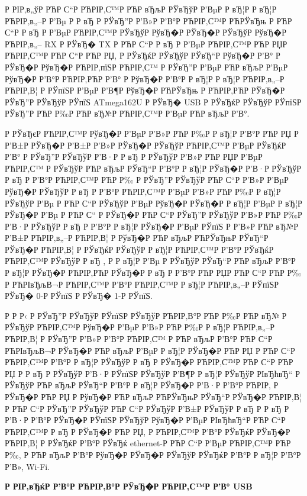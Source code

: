 \documentclass[a4paper,14pt]{extarticle}
\begin{document}
Р  РІР‚в„ўР РЋР С“Р РЋРІР‚С™Р РЋР вЂљР  РЎвЂўР  Р’ВµР  Р вЂ¦Р  Р вЂ¦Р РЋРІР‚в„–Р  Р’Вµ Р  Р вЂ  Р  РЎвЂ”Р  Р’В»Р  Р’В°Р РЋРІР‚С™Р РЋРЎвЂњ Р РЋР С“Р  Р вЂ Р  Р’ВµР РЋРІР‚С™Р  РЎвЂўР  РўвЂ�Р  РЎвЂ�Р  РЎвЂўР  РўвЂ�Р РЋРІР‚в„– RX Р  РЎвЂ� TX Р РЋР С“Р  Р вЂ Р  Р’ВµР РЋРІР‚С™Р РЋР РЏР РЋРІР‚С™Р РЋР С“Р РЋР РЏ, Р  РЎвЂќР  РЎвЂўР  РЎвЂ“Р  РўвЂ�Р  Р’В° Р  РЎвЂ�Р  РўвЂ�Р РЋРІР‚пїЅР РЋРІР‚С™ Р  РЎвЂ”Р  Р’ВµР РЋР вЂљР  Р’ВµР  РўвЂ�Р  Р’В°Р РЋРІР‚РЋР  Р’В° Р  РўвЂ�Р  Р’В°Р  Р вЂ¦Р  Р вЂ¦Р РЋРІР‚в„–Р РЋРІР‚В¦ Р  РЎпїЅР  Р’ВµР  Р’В¶Р  РўвЂ�Р РЋРЎвЂњ Р РЋРІР‚РЋР  РЎвЂ�Р  РЎвЂ”Р  РЎвЂўР  РЎпїЅ ATmega162U Р  РЎвЂ� USB Р  РЎвЂќР  РЎвЂўР  РЎпїЅР  РЎвЂ”Р РЋР Р‰Р РЋР вЂ№Р РЋРІР‚С™Р  Р’ВµР РЋР вЂљР  Р’В°.

Р  РЎвЂєР РЋРІР‚С™Р  РўвЂ�Р  Р’ВµР  Р’В»Р РЋР Р‰Р  Р вЂ¦Р  Р’В°Р РЋР РЏ Р  Р’В±Р  РЎвЂ�Р  Р’В±Р  Р’В»Р  РЎвЂ�Р  РЎвЂўР РЋРІР‚С™Р  Р’ВµР  РЎвЂќР  Р’В° Р  РЎвЂ”Р  РЎвЂўР  Р’В·Р  Р вЂ Р  РЎвЂўР  Р’В»Р РЋР РЏР  Р’ВµР РЋРІР‚С™ Р  РЎвЂўР РЋР вЂљР  РЎвЂ“Р  Р’В°Р  Р вЂ¦Р  РЎвЂ�Р  Р’В·Р  РЎвЂўР  Р вЂ Р  Р’В°Р РЋРІР‚С™Р РЋР Р‰ Р  РЎвЂ”Р  РЎвЂўР РЋР С“Р  Р’В»Р  Р’ВµР  РўвЂ�Р  РЎвЂўР  Р вЂ Р  Р’В°Р РЋРІР‚С™Р  Р’ВµР  Р’В»Р РЋР Р‰Р  Р вЂ¦Р  РЎвЂўР  Р’Вµ Р РЋР С“Р  РЎвЂўР  Р’ВµР  РўвЂ�Р  РЎвЂ�Р  Р вЂ¦Р  Р’ВµР  Р вЂ¦Р  РЎвЂ�Р  Р’Вµ Р РЋР С“ Р  РЎвЂ�Р РЋР С“Р  РЎвЂ”Р  РЎвЂўР  Р’В»Р РЋР Р‰Р  Р’В·Р  РЎвЂўР  Р вЂ Р  Р’В°Р  Р вЂ¦Р  РЎвЂ�Р  Р’ВµР  РЎпїЅ Р  Р’В»Р РЋР вЂ№Р  Р’В±Р РЋРІР‚в„–Р РЋРІР‚В¦ Р  РўвЂ�Р РЋР вЂљР РЋРЎвЂњР  РЎвЂ“Р  РЎвЂ�Р РЋРІР‚В¦ Р  РЎвЂќР  РЎвЂўР  Р вЂ¦Р РЋРІР‚С™Р  Р’В°Р  РЎвЂќР РЋРІР‚С™Р  РЎвЂўР  Р вЂ , Р  Р вЂ¦Р  Р’Вµ Р  РЎвЂўР  РЎвЂ“Р РЋР вЂљР  Р’В°Р  Р вЂ¦Р  РЎвЂ�Р РЋРІР‚РЋР  РЎвЂ�Р  Р вЂ Р  Р’В°Р РЋР РЏР РЋР С“Р РЋР Р‰ Р РЋРІвЂљВ¬Р РЋРІР‚С™Р  Р’В°Р РЋРІР‚С™Р  Р вЂ¦Р РЋРІР‚в„–Р  РЎпїЅР  РЎвЂ� 0-Р  РЎпїЅ Р  РЎвЂ� 1-Р  РЎпїЅ.

Р  Р Р‹ Р  РЎвЂ”Р  РЎвЂўР  РЎпїЅР  РЎвЂўР РЋРІР‚В°Р РЋР Р‰Р РЋР вЂ№ Р  РЎвЂўР РЋРІР‚С™Р  РўвЂ�Р  Р’ВµР  Р’В»Р РЋР Р‰Р  Р вЂ¦Р РЋРІР‚в„–Р РЋРІР‚В¦ Р  РЎвЂ”Р  Р’В»Р  Р’В°Р РЋРІР‚С™ Р РЋР вЂљР  Р’В°Р РЋР С“Р РЋРІвЂљВ¬Р  РЎвЂ�Р РЋР вЂљР  Р’ВµР  Р вЂ¦Р  РЎвЂ�Р РЋР РЏ Р РЋР С“Р РЋРІР‚С™Р  Р’В°Р  Р вЂ¦Р  РЎвЂўР  Р вЂ Р  РЎвЂ�Р РЋРІР‚С™Р РЋР С“Р РЋР РЏ Р  Р вЂ Р  РЎвЂўР  Р’В·Р  РЎпїЅР  РЎвЂўР  Р’В¶Р  Р вЂ¦Р  РЎвЂўР  РІвЂћвЂ“ Р  РЎвЂўР РЋР вЂљР  РЎвЂ“Р  Р’В°Р  Р вЂ¦Р  РЎвЂ�Р  Р’В·Р  Р’В°Р РЋРІР‚ Р  РЎвЂ�Р РЋР РЏ Р  РўвЂ�Р РЋР вЂљР РЋРЎвЂњР  РЎвЂ“Р  РЎвЂ�Р РЋРІР‚В¦ Р РЋР С“Р  РЎвЂ”Р  РЎвЂўР РЋР С“Р  РЎвЂўР  Р’В±Р  РЎвЂўР  Р вЂ  Р  Р вЂ Р  Р’В·Р  Р’В°Р  РЎвЂ�Р  РЎпїЅР  РЎвЂўР  РўвЂ�Р  Р’ВµР  РІвЂћвЂ“Р РЋР С“Р РЋРІР‚С™Р  Р вЂ Р  РЎвЂ�Р РЋР РЏ, Р РЋРІР‚С™Р  Р’В°Р  РЎвЂќР  РЎвЂ�Р РЋРІР‚В¦ Р  РЎвЂќР  Р’В°Р  РЎвЂќ ethernet-Р РЋР С“Р  Р’ВµР РЋРІР‚С™Р РЋР Р‰, Р РЋР вЂљР  Р’В°Р  РўвЂ�Р  РЎвЂ�Р  РЎвЂўР  РЎвЂќР  Р’В°Р  Р вЂ¦Р  Р’В°Р  Р’В», Wi-Fi.
\centerline{\large \bfseries Р  РІР‚вЂќР  Р’В°Р РЋРІР‚В°Р  РЎвЂ�Р РЋРІР‚С™Р  Р’В° USB}
\end{document}
